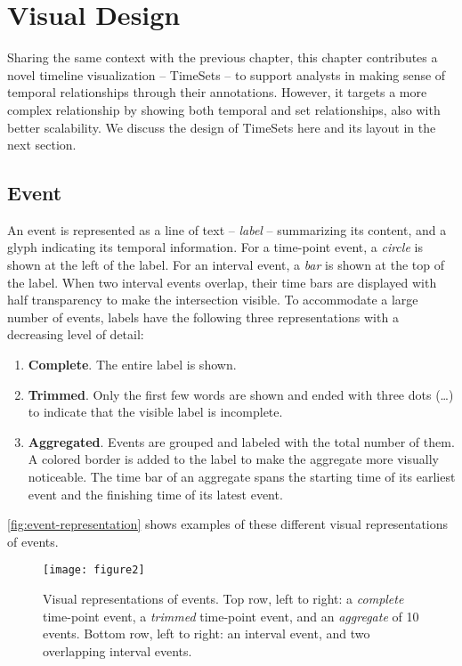 \section{Visual Design}
Sharing the same context with the previous chapter, this chapter contributes a novel timeline visualization -- TimeSets -- to support analysts in making sense of temporal relationships through their annotations. However, it targets a more complex relationship by showing both temporal and set relationships, also with better scalability. We discuss the design of TimeSets here and its layout in the next section.

\subsection{Event}
An event is represented as a line of text -- \emph{label} -- summarizing its content, and a glyph indicating its temporal information. For a time-point event, a \emph{circle} is shown at the left of the label. For an interval event, a \emph{bar} is shown at the top of the label. When two interval events overlap, their time bars are displayed with half transparency to make the intersection visible. To accommodate a large number of events, labels have the following three representations with a decreasing level of detail:
\begin{enumerate}
	\item \textbf{Complete}. The entire label is shown.
	\item \textbf{Trimmed}. Only the first few words are shown and ended with three dots (\dots) to indicate that the visible label is incomplete.
	\item \textbf{Aggregated}. Events are grouped and labeled with the total number of them. A colored border is added to the label to make the aggregate more visually noticeable. The time bar of an aggregate spans the starting time of its earliest event and the finishing time of its latest event.
\end{enumerate}

\autoref{fig:event-representation} shows examples of these different visual representations of events.

\begin{figure}[b]
\centering
\texttt{[image: figure2]}
\caption[Visual representations of events]{Visual representations of events. Top row, left to right: a \emph{complete} time-point event, a \emph{trimmed} time-point event, and an \emph{aggregate} of 10 events. Bottom row, left to right: an interval event, and two overlapping interval events.}
\label{fig:event-representation}
\end{figure}

